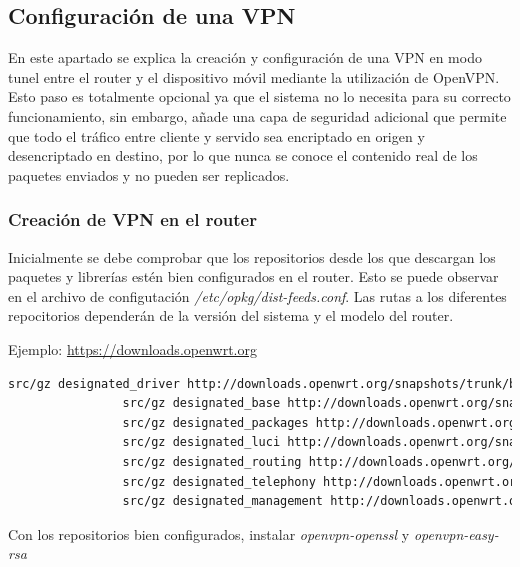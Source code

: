 \documentclass{article}
\begin{document}
    \subsection{Configuración de una VPN} 
        En este apartado se explica la creación y configuración de una VPN en modo tunel entre el router y el dispositivo móvil mediante la utilización de OpenVPN. Esto paso es totalmente opcional ya que el sistema no lo necesita para su correcto funcionamiento, sin embargo, añade una capa de seguridad adicional que permite que todo el tráfico entre cliente y servido sea encriptado en origen y desencriptado en destino, por lo que nunca se conoce el contenido real de los paquetes enviados y no pueden ser replicados.

        \subsubsection{Creación de VPN en el router}
            Inicialmente se debe comprobar que los repositorios desde los que descargan los paquetes y librerías estén bien configurados en el router. Esto se puede observar en el archivo de configutación \textit{/etc/opkg/dist-feeds.conf}. Las rutas a los diferentes repocitorios dependerán de la versión del sistema y el modelo del router.

            Ejemplo:
            \url{https://downloads.openwrt.org}

            \begin{lstlisting}[language=bash]
                src/gz designated_driver http://downloads.openwrt.org/snapshots/trunk/brcm63xx/smp/packages/packages
                src/gz designated_base http://downloads.openwrt.org/snapshots/trunk/brcm63xx/smp/packages/base
                src/gz designated_packages http://downloads.openwrt.org/snapshots/trunk/brcm63xx/smp/packages/packages
                src/gz designated_luci http://downloads.openwrt.org/snapshots/trunk/brcm63xx/smp/packages/luci
                src/gz designated_routing http://downloads.openwrt.org/snapshots/trunk/brcm63xx/smp/packages/routing
                src/gz designated_telephony http://downloads.openwrt.org/snapshots/trunk/brcm63xx/smp/packages/telephony
                src/gz designated_management http://downloads.openwrt.org/snapshots/trunk/brcm63xx/smp/packages/management
            \end{lstlisting}
            
            Con los repositorios bien configurados, instalar \textit{openvpn-openssl} y \textit{openvpn-easy-rsa}
            
\end{document}
